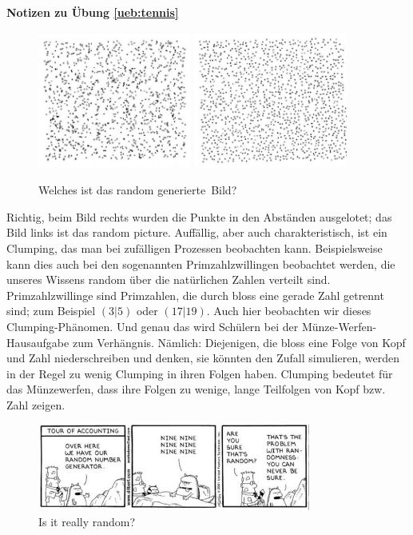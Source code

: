 \documentclass[%
<<<<<<< Updated upstream
<<<<<<< Updated upstream
11pt,%
twoside,%
titlepage,%
german,%
=======
=======
>>>>>>> Stashed changes
11pt,%
twoside,%
titlepage,%
swissgerman,%
<<<<<<< Updated upstream
>>>>>>> Stashed changes
=======
>>>>>>> Stashed changes
headsepline%
]{scrartcl}
\newcommand{\faReturnGray}{\textcolor{gray}{\faMailReply}} %
\newcommand{\definition}[1]{\colorbox{emerald}{#1}}
\theoremstyle{definition}
\theoremstyle{plain}
\newcommand{\concatueb}[1]{ueb:#1}%
\newcommand{\concatlsg}[1]{lsg:#1}%
\newenvironment{lsg}[1]{%
    \par\noindent\textbf{Notizen zu Übung \ref{\concatueb{#1}}}\label{\concatlsg{#1}}
    \hfill\hyperref[\concatueb{#1}]{\faReturnGray}\par %
}{%
    \par%
}
\newcommand{\concatueb}[1]{ueb:#1}%
\newcommand{\concatlsg}[1]{lsg:#1}%
\newenvironment{lsg}[1]{%
    \par\noindent\textbf{Notizen zu Übung \ref{\concatueb{#1}}.}%
    \label{\concatlsg{#1}}
}{%
    \par%
}
\newcommand{\definition}[1]{\colorbox{emerald}{#1}}
\begin{document}
\begin{lsg}{tennis}
\begin{figure}[h]
    \centering
    \includegraphics[width=0.45\textwidth]{pictures/pointa.jpg}
    \includegraphics[width=0.45\textwidth]{pictures/pointb.jpg}
    \caption{Welches ist das \glqq random generierte\grqq\ Bild?}
    \label{fig:randomness}
\end{figure}

Richtig, beim Bild rechts wurden die Punkte in den Abständen ausgelotet; das Bild links ist das random picture. Auffällig, aber auch charakteristisch, ist ein \glqq Clumping\grqq, das man bei zufälligen Prozessen beobachten kann. Beispielsweise kann dies auch bei den sogenannten Primzahlzwillingen beobachtet werden, die unseres Wissens random über die natürlichen Zahlen verteilt sind. \definition{Primzahlzwillinge} sind Primzahlen, die durch bloss eine gerade Zahl getrennt sind; zum Beispiel $(3|5)$ oder $(17|19)$. Auch hier beobachten wir dieses Clumping-Phänomen. Und genau das wird Schülern bei der Münze-Werfen-Hausaufgabe zum Verhängnis. Nämlich: Diejenigen, die bloss eine Folge von Kopf und Zahl niederschreiben und denken, sie könnten den Zufall simulieren, werden in der Regel zu wenig Clumping in ihren Folgen haben. Clumping bedeutet für das Münzewerfen, dass ihre Folgen zu wenige, lange Teilfolgen von Kopf bzw. Zahl zeigen.

\begin{figure}
    \centering
    \includegraphics[width=0.8\textwidth]{pictures/randomgenerator.jpg}
    \caption{Is it really random?}
\end{figure}


\end{lsg}
\end{document}
